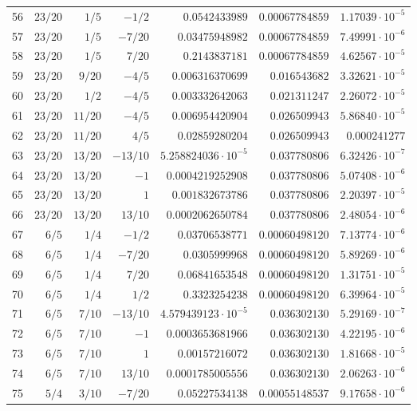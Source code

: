 \documentclass[11pt,reqno]{amsart}
\numberwithin{equation}{section}
\theoremstyle{definition}
\theoremstyle{remark}
\begin{document}
\begin{center}
\begin{longtable}{@{}rrrrrrr@{}}
56 & $23/20$ & $1/5$ & $-1/2$ & $0.0542433989$ & $0.00067784859$ & $1.17039\cdot10^{-5}$\\
57 & $23/20$ & $1/5$ & $-7/20$ & $0.03475948982$ & $0.00067784859$ & $7.49991\cdot10^{-6}$\\
58 & $23/20$ & $1/5$ & $7/20$ & $0.2143837181$ & $0.00067784859$ & $4.62567\cdot10^{-5}$\\
59 & $23/20$ & $9/20$ & $-4/5$ & $0.006316370699$ & $0.016543682$ & $3.32621\cdot10^{-5}$\\
60 & $23/20$ & $1/2$ & $-4/5$ & $0.003332642063$ & $0.021311247$ & $2.26072\cdot10^{-5}$\\
61 & $23/20$ & $11/20$ & $-4/5$ & $0.006954420904$ & $0.026509943$ & $5.86840\cdot10^{-5}$\\
62 & $23/20$ & $11/20$ & $4/5$ & $0.02859280204$ & $0.026509943$ & $0.000241277$\\
63 & $23/20$ & $13/20$ & $-13/10$ & $5.258824036\cdot10^{-5}$ & $0.037780806$ & $6.32426\cdot10^{-7}$\\
64 & $23/20$ & $13/20$ & $-1$ & $0.0004219252908$ & $0.037780806$ & $5.07408\cdot10^{-6}$\\
65 & $23/20$ & $13/20$ & $1$ & $0.001832673786$ & $0.037780806$ & $2.20397\cdot10^{-5}$\\
66 & $23/20$ & $13/20$ & $13/10$ & $0.0002062650784$ & $0.037780806$ & $2.48054\cdot10^{-6}$\\
67 & $6/5$ & $1/4$ & $-1/2$ & $0.03706538771$ & $0.00060498120$ & $7.13774\cdot10^{-6}$\\
68 & $6/5$ & $1/4$ & $-7/20$ & $0.0305999968$ & $0.00060498120$ & $5.89269\cdot10^{-6}$\\
69 & $6/5$ & $1/4$ & $7/20$ & $0.06841653548$ & $0.00060498120$ & $1.31751\cdot10^{-5}$\\
70 & $6/5$ & $1/4$ & $1/2$ & $0.3323254238$ & $0.00060498120$ & $6.39964\cdot10^{-5}$\\
71 & $6/5$ & $7/10$ & $-13/10$ & $4.579439123\cdot10^{-5}$ & $0.036302130$ & $5.29169\cdot10^{-7}$\\
72 & $6/5$ & $7/10$ & $-1$ & $0.0003653681966$ & $0.036302130$ & $4.22195\cdot10^{-6}$\\
73 & $6/5$ & $7/10$ & $1$ & $0.00157216072$ & $0.036302130$ & $1.81668\cdot10^{-5}$\\
74 & $6/5$ & $7/10$ & $13/10$ & $0.0001785005556$ & $0.036302130$ & $2.06263\cdot10^{-6}$\\
75 & $5/4$ & $3/10$ & $-7/20$ & $0.05227534138$ & $0.00055148537$ & $9.17658\cdot10^{-6}$\\

\end{longtable}
\end{center}
\end{document}
